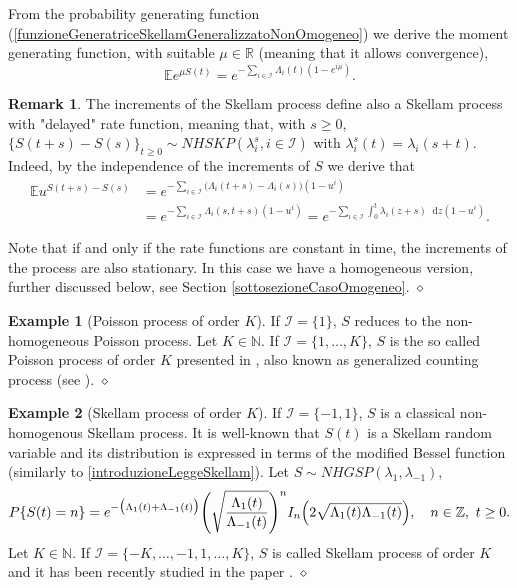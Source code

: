 \documentclass[12pt, twoside, english, headsepline]{article}
\newcommand*\dif{\mathop{}\!\mathrm{d}}  %
\theoremstyle{definition} %
\newtheorem{example}{Example}[section]
\newtheorem{remark}{Remark}[section] %
\numberwithin{equation}{section} %
\begin{document}
From the probability generating function (\ref{funzioneGeneratriceSkellamGeneralizzatoNonOmogeneo}) we derive the moment generating function, with suitable $\mu\in\mathbb{R}$ (meaning that it allows convergence),
\begin{equation}\label{funzioneGeneratriceMomentiSkellamGeneralizzatoNonOmogeneo}
\mathbb{E} e^{\mu S(t)} =  e^{-\sum_{i\in\mathcal{I}} \Lambda_i(t)(1-e^{i\mu}) }.
\end{equation}

\begin{remark}\label{remarkIncrementiSkellamGeneralizzato}
The increments of the Skellam process define also a Skellam process with "delayed" rate function, meaning that, with $s\ge0$, $\{S(t+s)-S(s)\}_{t\ge0} \sim NHSKP(\lambda^s_i, i\in \mathcal{I})$ with $\lambda_i^s(t) = \lambda_i(s+t)$. Indeed, by the independence of the increments of $S$ we derive that
\begin{align}
\mathbb{E}u^{S(t+s)-S(s)}& = e^{-\sum_{i\in\mathcal{I}}\bigl(\Lambda_i(t+s)-\Lambda_i(s)\bigr)(1-u^i) }  \nonumber \\
&= e^{-\sum_{i\in\mathcal{I}}\Lambda_i(s,t+s)(1-u^i)} = e^{-\sum_{i\in\mathcal{I}}\int_0^t\lambda_i(z+s)\dif z(1-u^i)}.\label{incrementoSkellamGeneralizzato}
\end{align}

Note that if and only if the rate functions are constant in time, the increments of the process are also stationary. In this case we have a homogeneous version, further discussed below, see Section \ref{sottosezioneCasoOmogeneo}.
\hfill$\diamond$
\end{remark}


\begin{example}[Poisson process of order $K$]
If $\mathcal{I} = \{1\}$, $S$ reduces to the non-homogeneous Poisson process. Let $K\in\mathbb{N}$. If $\mathcal{I} = \{1,\dots,K\}$, $S$ is the so called Poisson process of order $K$ presented in \cite{P1984}, also known as generalized counting process (see \cite{BS2024, DcMM2016}).
\hfill$\diamond$
\end{example}

\begin{example}[Skellam process of order $K$]
If $\mathcal{I} = \{-1,1\}$, $S$ is a classical non-homogenous Skellam process. It is well-known that $S(t)$ is a Skellam random variable and its distribution is expressed in terms of the modified Bessel function (similarly to \eqref{introduzioneLeggeSkellam}). Let $S\sim NHGSP (\lambda_{1}, \lambda_{-1})$,
\begin{equation}\label{probabilitaMassaSkellamClassico}
P\{S(t) = n\}= e^{-\bigl(\Lambda_1(t)+\Lambda_{-1}(t)\bigr)} \Biggl(\sqrt{\frac{\Lambda_1(t)}{\Lambda_{-1}(t)}}\Biggr)^n I_n\Bigl(2\sqrt{\Lambda_1(t)\Lambda_{-1}(t)}\Bigr), \ \ \ n\in\mathbb{Z}, \ t\ge0.
\end{equation}
Let $K\in\mathbb{N}$. If $\mathcal{I} = \{-K,\dots,-1,1,\dots,K\}$, $S$ is called Skellam process of order $K$ and it has been recently studied in the paper \cite{GKL2020}.
\hfill$\diamond$
\end{example}
\end{document}
